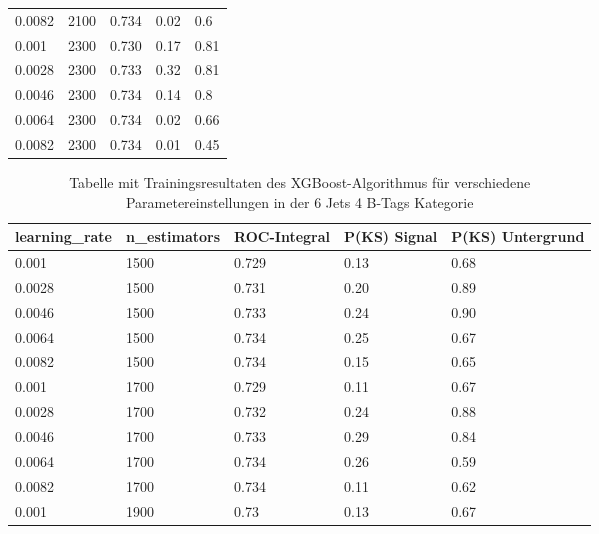 \begin{table}[tbp]
\begin{center}
\begin{tabular}{lllll}
\num{0,0082} & \num{2100} & \num{0,734} & \num{0,02} & \num{0,6}\\
\num{0,001}  & \num{2300} & \num{0,730} & \num{0,17} & \num{0,81}\\
\num{0,0028} & \num{2300} & \num{0,733} & \num{0,32} & \num{0,81}\\
\num{0,0046} & \num{2300} & \num{0,734} & \num{0,14} & \num{0,8}\\
\num{0,0064} & \num{2300} & \num{0,734} & \num{0,02} & \num{0,66}\\
\num{0,0082} & \num{2300} & \num{0,734} & \num{0,01} & \num{0,45}\\
  \hline
  \end{tabular}
  \end{center}
\end{table}

\begin{table}[tbp]\parbox{12cm}{
  \caption[XGBoost 6j4t Ergebnisse]{Tabelle mit Trainingsresultaten des XGBoost-Algorithmus f\"ur verschiedene Parametereinstellungen in der 6 Jets 4 B-Tags Kategorie}%
  }\label{tab:xgboost_6j4t}
  \begin{center}
  \begin{tabular}{lllll}
  \hline
  learning\_rate & n\_estimators & ROC-Integral & P(KS) Signal & P(KS) Untergrund\\
  \hline
\num{0,001}  & \num{1500} & \num{0,729} & \num{0,13} & \num{0,68}\\
\num{0,0028} & \num{1500} & \num{0,731} & \num{0,20} & \num{0,89}\\
\num{0,0046} & \num{1500} & \num{0,733} & \num{0,24} & \num{0,90}\\
\num{0,0064} & \num{1500} & \num{0,734} & \num{0,25} & \num{0,67}\\
\num{0,0082} & \num{1500} & \num{0,734} & \num{0,15} & \num{0,65}\\
\num{0,001}  & \num{1700} & \num{0,729} & \num{0,11} & \num{0,67}\\
\num{0,0028} & \num{1700} & \num{0,732} & \num{0,24} & \num{0,88}\\
\num{0,0046} & \num{1700} & \num{0,733} & \num{0,29} & \num{0,84}\\
\num{0,0064} & \num{1700} & \num{0,734} & \num{0,26} & \num{0,59}\\
\num{0,0082} & \num{1700} & \num{0,734} & \num{0,11} & \num{0,62}\\
\num{0,001}  & \num{1900} & \num{0,73}  & \num{0,13} & \num{0,67}\\

\end{tabular}
\end{center}
\end{table}
